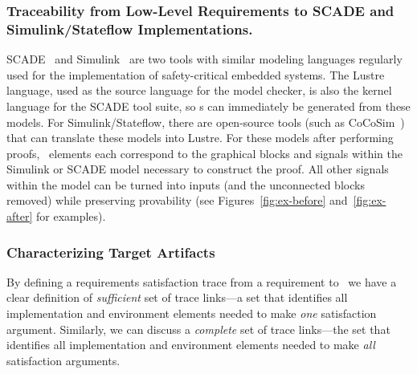
\subsubsection{Traceability from Low-Level Requirements to SCADE and Simulink/Stateflow Implementations.}
SCADE~\cite{Scade} and Simulink~\cite{Simulink:Website} are two tools with similar modeling languages regularly used for the implementation of safety-critical embedded systems.  The Lustre language, used as the source language for the \jkind model checker, is also the kernel language for the SCADE tool suite, so \mivc s can immediately be generated from these models.  For Simulink/Stateflow, there are open-source tools (such as CoCoSim~\cite{LPAR-21:Automated_analysis_of_Stateflow}) that can translate these models into Lustre.
For these models after performing proofs, \mivc\ elements each correspond to the graphical blocks and signals within the Simulink or SCADE model necessary to construct the proof.  All other signals within the model can be turned into inputs (and the unconnected blocks removed) while preserving provability (see Figures~\ref{fig:ex-before} and~\ref{fig:ex-after} for examples).




\subsubsection{Characterizing Target Artifacts}

By defining a requirements satisfaction trace from a requirement to \mivcs\ we have a clear definition of \emph{sufficient} set of trace links---a set that identifies all implementation and environment elements needed to make \emph{one} satisfaction argument. Similarly, we can discuss a \emph{complete} set of trace links---the set that identifies all implementation and environment elements needed to make \emph{all} satisfaction arguments.

